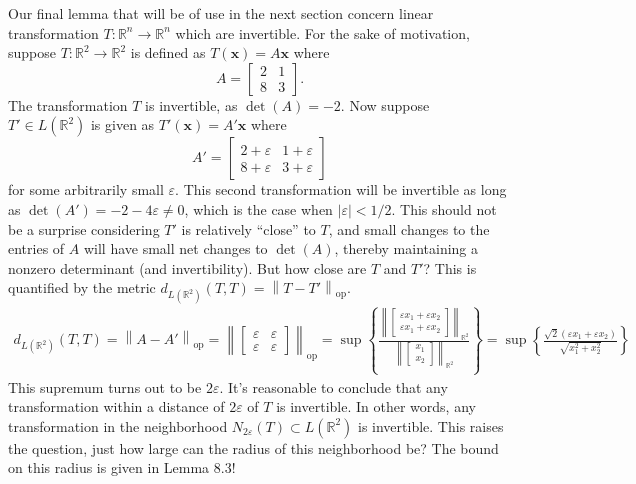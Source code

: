 \documentclass{article}
\newcommand{\R}{\mathbb{R}}
\newcommand{\x}{\mathbf{x}}
\newcommand{\norm}[1]{\left\lVert#1\right\rVert}
\newcommand{\normop}[1]{\left\lVert#1\right\rVert_\text{op}}
\theoremstyle{definition}
\begin{document}
Our final lemma that will be of use in the next section concern linear transformation $ T:\R^n\to\R^n $ which are invertible. For the sake of motivation, suppose $ T:\R^2\to\R^2 $ is defined as $ T(\x)=A\x $ where 
$$A = \begin{bmatrix}
	2 & 1 \\ 8 & 3
\end{bmatrix} .$$ The transformation $ T $ is invertible, as $ \det(A)= -2 $. Now suppose $ T'\in L(\R^2) $ is given as $ T'(\x)=A'\x $ where 
$$A' = \begin{bmatrix}
	2 +\varepsilon & 1 +\varepsilon\\ 8 +\varepsilon& 3+\varepsilon
\end{bmatrix} $$ for some arbitrarily small $ \varepsilon $. This second transformation will be invertible as long as $\det(A')= -2 - 4\varepsilon\neq 0$, which is the case when $ |\varepsilon| < 1/2 $. This should not be a surprise considering $ T' $ is relatively ``close'' to $ T $, and small changes to the entries of $ A $ will have small net changes to $ \det(A) $, thereby maintaining a nonzero determinant (and invertibility). But how close are $ T $ and $ T' $? This is quantified by the metric $ d_{L(\R^2)}(T,T)=\normop{T - T'} $. 
\begin{align*}
	d_{L(\R^2)}(T,T)= \normop{A-A'}  =  \normop{\begin{bmatrix}
			\varepsilon&\varepsilon\\
			\varepsilon& \varepsilon
	\end{bmatrix}} = \sup\left\{\frac{\norm{\begin{bmatrix}
		\varepsilon x_1 + \varepsilon x_2 \\	\varepsilon x_1 + \varepsilon x_2
\end{bmatrix}}_{\R^2}}{\norm{\begin{bmatrix}
x_1\\x_2
\end{bmatrix}}_{\R^2}}\right\} =\sup\left\{\frac{\sqrt{2}(\varepsilon x_1 + \varepsilon x_2)}{\sqrt{x_1^2 + x_2^2}}\right\}
\end{align*}
This supremum turns out to be $ 2\varepsilon $. It's reasonable to conclude that any transformation within a distance of $ 2\varepsilon $ of $ T $ is invertible. In other words, any transformation in the neighborhood $ N_{2\varepsilon}(T)\subset L(\R^2) $ is invertible. This raises the question, just how large can the radius of this neighborhood be? The bound on this radius is given in Lemma 8.3! 
\end{document}
